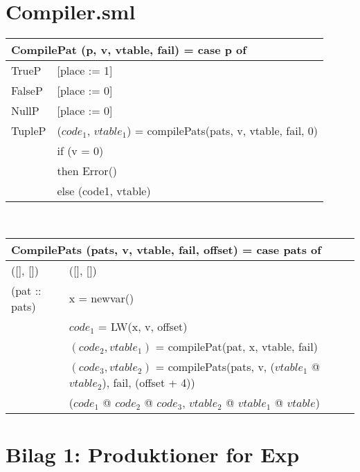 \documentclass [10pt,a4paper]{article}
\begin{document}
\section{Compiler.sml}
\begin{tabular}{|l|l|}
  \hline
  \multicolumn{2}{|l|}{CompilePat (p, v, vtable, fail) = case p of} \\
	\hline
	TrueP & [place := 1] \\
	\hline
	FalseP & [place := 0] \\ 
	\hline
	NullP & [place := 0] \\ 
	\hline
	TupleP & ($code_1$, $vtable_1$) = compilePats(pats, v, vtable, fail, 0) \\ 
		   & if (v = 0) \\
		   & then Error() \\
		   & else (code1, vtable) \\
	\hline
\end{tabular}
\\
\begin{tabular}{|l|l|}
  \hline
  \multicolumn{2}{|l|}{CompilePats (pats, v, vtable, fail, offset) = case pats of} \\
	\hline
	([], []) & ([], []) \\
	\hline
	(pat :: pats) & x = newvar() \\
	& $code_1$ = LW(x, v, offset) \\
	& $(code_2, vtable_1)$ = compilePat(pat, x, vtable, fail) \\
	& $(code_3, vtable_2)$ = compilePats(pats, v, ($vtable_1$ @ $vtable_2$), fail, (offset + 4)) \\
	& ($code_1$ @ $code_2$ @ $code_3$, $vtable_2$ @ $vtable_1$ @ $vtable$) \\
	\hline
\end{tabular}

\newpage 

\section{Bilag 1: Produktioner for Exp}
\end{document}
